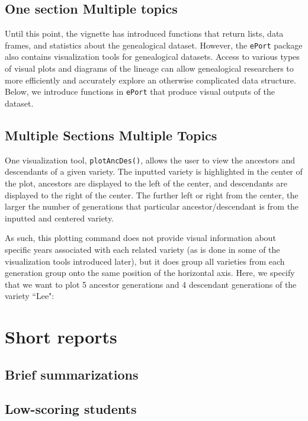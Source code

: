\documentclass{article}\usepackage[]{graphicx}\usepackage[]{color}
\numberwithin{equation}{section} %
\newcommand{\pkg}[1]{{\texttt{#1}}}
\begin{document}
\subsection{One section Multiple topics}

Until this point, the vignette has introduced functions that return lists, data frames, and statistics about the genealogical dataset. However, the \pkg{ePort} package also contains visualization tools for genealogical datasets. Access to various types of visual plots and diagrams of the lineage can allow genealogical researchers to more efficiently and accurately explore an otherwise complicated data structure. Below, we introduce functions in \pkg{ePort} that produce visual outputs of the dataset.

\subsection{Multiple Sections Multiple Topics}

One visualization tool, \texttt{plotAncDes()}, allows the user to view the ancestors and descendants of a given variety. The inputted variety is highlighted in the center of the plot, ancestors are displayed to the left of the center, and descendants are displayed to the right of the center. The further left or right from the center, the larger the number of generations that particular ancestor/descendant is from the inputted and centered variety.

As such, this plotting command does not provide visual information about specific years associated with each related variety (as is done in some of the visualization tools introduced later), but it does group all varieties from each generation group onto the same position of the horizontal axis. Here, we specify that we want to plot 5 ancestor generations and 4 descendant generations of the variety ``Lee":

\section{Short reports}

\subsection{Brief summarizations}
\subsection{Low-scoring students}
\end{document}
